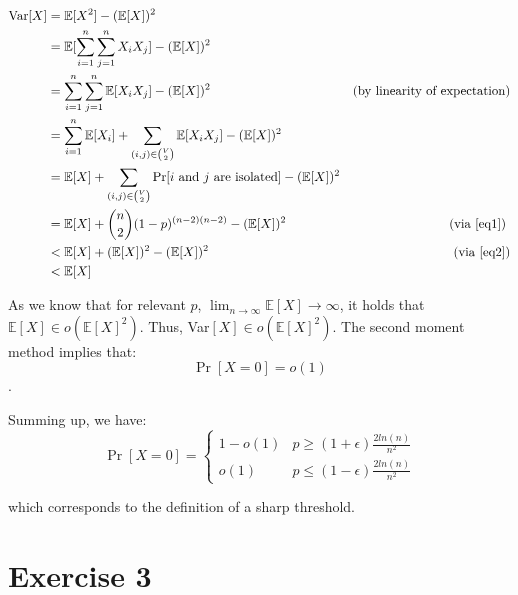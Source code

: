 \documentclass[a4paper,german]{article}
\begin{document}
\begin{enumerate}
\begin{align*}
\text{Var}[X] &= \mathbb{E}[X^2] - (\mathbb{E}[X])^2\\
&= \mathbb{E}[\sum_{i=1}^n \sum_{j = 1}^n X_i X_j] - (\mathbb{E}[X])^2\\
&= \sum_{i=1}^n \sum_{j = 1}^n \mathbb{E}[X_i X_j]  - (\mathbb{E}[X])^2 & \text{(by linearity of expectation)}\\
&= \sum_{i=1}^n \mathbb{E}[X_i] + \sum_{(i,j) \in {{V} \choose{2}}} \mathbb{E}[X_i X_j]  - (\mathbb{E}[X])^2 \\
&= \mathbb{E}[X] +   \sum_{(i,j) \in {{V} \choose{2}}} \Pr[i \text{ and } j \text{ are isolated}] - (\mathbb{E}[X])^2 \\
&= \mathbb{E}[X] + {{n} \choose {2}}   (1-p)^{(n-2)(n-2) } - (\mathbb{E}[X])^2 &  \text{(via \ref{eq1}) } \\
&< \mathbb{E}[X] +  (\mathbb{E}[X])^2   - (\mathbb{E}[X])^2 & \text{(via \ref{eq2})} \\
&< \mathbb{E}[X]
\end{align*}

As we know that for relevant \(p\), \(\lim_{n \to \infty} \mathbb{E}[X] \to \infty\), it holds that \(\mathbb{E}[X] \in o (\mathbb{E}[X]^2) \). Thus, Var\([X] \in o (\mathbb{E}[X]^2) \). The second moment method implies that:
$$ \Pr[X=0] = o(1) $$.

\end{enumerate}

Summing up, we have:
\[
    \Pr[X=0] = 
\begin{cases}
   1 - o(1) & p \geq (1+\epsilon)\frac{2ln(n)}{n^2}\\
   o(1)             & p \leq (1- \epsilon)\frac{2ln(n)}{n^2}
\end{cases}
\]

which corresponds to the definition of a sharp threshold.

\section*{Exercise 3}
\end{document}

